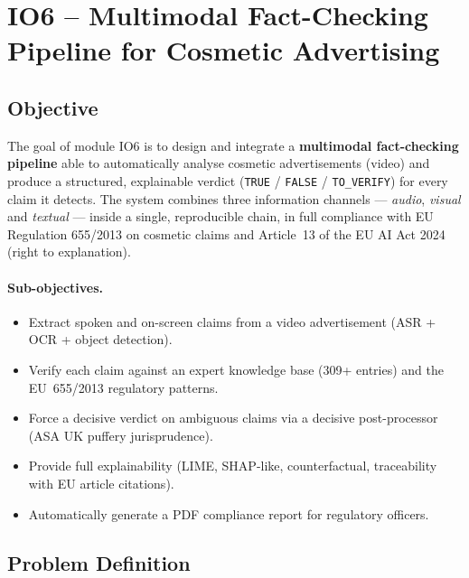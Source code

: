 \documentclass[11pt,a4paper]{article}
\newcommand{\verdict}[1]{\texttt{#1}}
\begin{document}
\section{IO6 -- Multimodal Fact-Checking Pipeline for Cosmetic Advertising}

\subsection{Objective}

The goal of module IO6 is to design and integrate a \textbf{multimodal
fact-checking pipeline} able to automatically analyse cosmetic advertisements
(video) and produce a structured, explainable verdict
(\verdict{TRUE} / \verdict{FALSE} / \verdict{TO\_VERIFY}) for every claim it
detects. The system combines three information channels --- \emph{audio},
\emph{visual} and \emph{textual} --- inside a single, reproducible chain, in full
compliance with EU Regulation 655/2013 on cosmetic claims and Article~13 of the
EU AI Act 2024 (right to explanation).

\paragraph{Sub-objectives.}
\begin{itemize}[noitemsep]
  \item Extract spoken and on-screen claims from a video advertisement
  (ASR + OCR + object detection).
  \item Verify each claim against an expert knowledge base (309+ entries) and the
  EU~655/2013 regulatory patterns.
  \item Force a decisive verdict on ambiguous claims via a decisive
  post-processor (ASA UK puffery jurisprudence).
  \item Provide full explainability (LIME, SHAP-like, counterfactual, traceability
  with EU article citations).
  \item Automatically generate a PDF compliance report for regulatory officers.
\end{itemize}

\subsection{Problem Definition}
\end{document}
